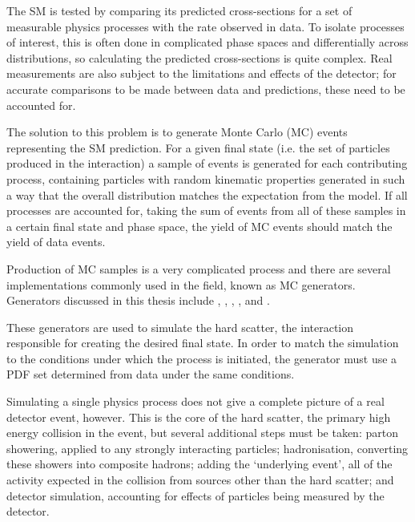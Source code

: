 
The \ac{SM} is tested by comparing its predicted cross-sections for a set of
measurable physics processes with the rate observed in data. To isolate
processes of interest, this is often done in complicated phase spaces and
differentially across distributions, so calculating the predicted cross-sections
is quite complex. Real measurements are also subject to the limitations and
effects of the detector; for accurate comparisons to be made between data and
predictions, these need to be accounted for.

The solution to this problem is to generate Monte Carlo (MC) events representing
the \ac{SM} prediction. For a given final state (i.e. the set of particles
produced in the interaction) a sample of events is generated for each
contributing process, containing particles with random kinematic properties
generated in such a way that the overall distribution matches the expectation
from the model. If all processes are accounted for, taking the sum of events
from all of these samples in a certain final state and phase space, the
yield of \ac{MC} events should match the yield of data events.

Production of \ac{MC} samples is a very complicated process and there are
several implementations commonly used in the field, known as
\ac{MC} generators. Generators discussed in this thesis include \madgraph
\cite{madgraph5amc}, \sherpa \cite{sherpa2dot2}, \pythia \cite{pythia8dot2},
\powheg \cite{powheg}, and \herwig \cite{herwigpp}.

These generators are used to simulate the hard scatter, the interaction
responsible for creating the desired final state. In order to match the
simulation to the conditions under which the process is initiated, the generator
must use a \ac{PDF} set determined from data under the same conditions.

Simulating a single physics process does not give a complete picture of a real
detector event, however. This is the core of the hard scatter, the primary high
energy collision in the event, but several additional steps must be taken:
parton showering, applied to any strongly interacting particles; hadronisation,
converting these showers into composite hadrons; adding the `underlying event',
all of the activity expected in the collision from sources other than the hard
scatter; and detector simulation, accounting for effects of particles being
measured by the detector.

